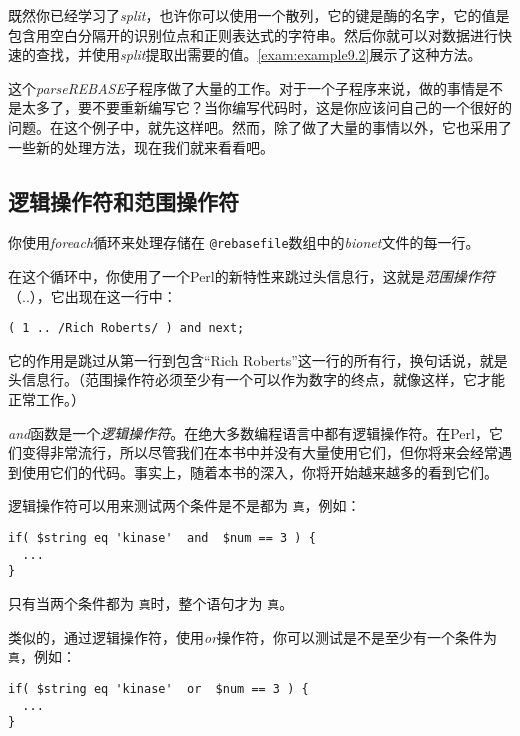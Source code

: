 既然你已经学习了\textit{split}，也许你可以使用一个散列，它的键是酶的名字，它的值是包含用空白分隔开的识别位点和正则表达式的字符串。然后你就可以对数据进行快速的查找，并使用\textit{split}提取出需要的值。\autoref{exam:example9.2}展示了这种方法。



这个\textit{parseREBASE}子程序做了大量的工作。对于一个子程序来说，做的事情是不是太多了，要不要重新编写它？当你编写代码时，这是你应该问自己的一个很好的问题。在这个例子中，就先这样吧。然而，除了做了大量的事情以外，它也采用了一些新的处理方法，现在我们就来看看吧。

\subsection{逻辑操作符和范围操作符}
你使用\textit{foreach}循环来处理存储在 \verb|@rebasefile|数组中的\textit{bionet}文件的每一行。

在这个循环中，你使用了一个Perl的新特性来跳过头信息行，这就是\textit{范围操作符}（..），它出现在这一行中：

\begin{lstlisting}
( 1 .. /Rich Roberts/ ) and next;
\end{lstlisting}

它的作用是跳过从第一行到包含“Rich Roberts”这一行的所有行，换句话说，就是头信息行。（范围操作符必须至少有一个可以作为数字的终点，就像这样，它才能正常工作。）

\textit{and}函数是一个\textit{逻辑操作符}。在绝大多数编程语言中都有逻辑操作符。在Perl，它们变得非常流行，所以尽管我们在本书中并没有大量使用它们，但你将来会经常遇到使用它们的代码。事实上，随着本书的深入，你将开始越来越多的看到它们。

逻辑操作符可以用来测试两个条件是不是都为 \verb|真|，例如：

\begin{lstlisting}
if( $string eq 'kinase'  and  $num == 3 ) {
  ...
}
\end{lstlisting}

只有当两个条件都为 \verb|真|时，整个语句才为 \verb|真|。

类似的，通过逻辑操作符，使用\textit{or}操作符，你可以测试是不是至少有一个条件为 \verb|真|，例如：

\begin{lstlisting}
if( $string eq 'kinase'  or  $num == 3 ) {
  ...
}
\end{lstlisting}

